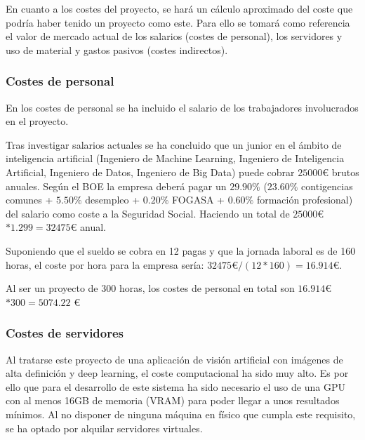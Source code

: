 En cuanto a los costes del proyecto, se hará un cálculo aproximado del coste que podría haber tenido un proyecto como este. Para ello se tomará como referencia el valor de mercado actual de los salarios (costes de personal), los servidores y uso de material y gastos pasivos (costes indirectos).


\subsubsection{Costes de personal}\label{subsec:personal}

En los costes de personal se ha incluido el salario de los trabajadores involucrados en el proyecto. 

Tras investigar salarios actuales se ha concluido que un junior en el ámbito de inteligencia artificial (Ingeniero de Machine Learning, Ingeniero de Inteligencia Artificial, Ingeniero de Datos, Ingeniero de Big Data) puede cobrar $25000 $€$ $ brutos anuales. Según el BOE \cite{BOE} la empresa deberá pagar un $29.90\%$ ($23.60\%$ contigencias comunes + $5.50\%$ desempleo + $0.20\%$ FOGASA + $0.60\%$ formación profesional) del salario como coste a la Seguridad Social. Haciendo un total de $25000 $€$ * 1.299 = 32475 $€ anual.

Suponiendo que el sueldo se cobra en 12 pagas y que la jornada laboral es de 160 horas, el coste por hora para la empresa sería: $32475 $€$ / (12 * 160) = 16.914$€.

Al ser un proyecto de 300 horas, los costes de personal en total son $16.914 $€$ * 300 = 5074.22 $ €

\subsubsection{Costes de servidores}\label{subsec:servidores}

Al tratarse este proyecto de una aplicación de visión artificial con imágenes de alta definición y deep learning, el coste computacional ha sido muy alto. Es por ello que para el desarrollo de este sistema ha sido necesario el uso de una GPU con al menos 16GB de memoria (VRAM) para poder llegar a unos resultados mínimos. Al no disponer de ninguna máquina en físico que cumpla este requisito, se ha optado por alquilar servidores virtuales.

